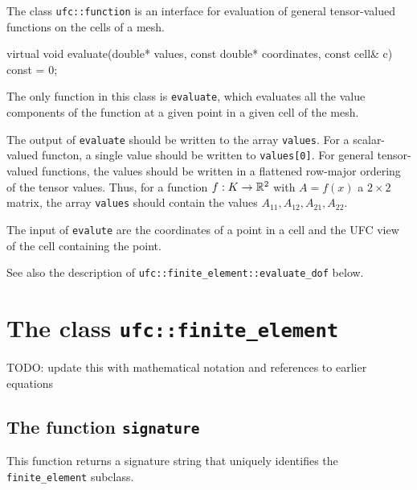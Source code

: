 The class \texttt{ufc::function} is an interface for evaluation of
general tensor-valued functions on the cells of a mesh.

\begin{code}
virtual void evaluate(double* values,
                      const double* coordinates,
                      const cell& c) const = 0;
\end{code}

The only function in this class is \texttt{evaluate},
which evaluates all the value components of the function at a given
point in a given cell of the mesh.

The output of \texttt{evaluate} should be written to the array
\texttt{values}. For a scalar-valued functon, a single value should be
written to \texttt{values[0]}. For general tensor-valued functions,
the values should be written in a flattened row-major ordering of the
tensor values. Thus, for a function $f : K \rightarrow \mathbb{R}^2$ with $A =
f(x)$ a $2 \times 2$ matrix, the array \texttt{values} should contain
the values $A_{11}, A_{12}, A_{21}, A_{22}$.

The input of \texttt{evalute} are the coordinates of a point in a cell and
the UFC view of the cell containing the point.

See also the description of
\texttt{ufc::finite\_element::evaluate\_dof}
below.

\section{The class \texttt{ufc::finite\_element}}

TODO: update this with mathematical notation and references to earlier equations






\subsection{The function \texttt{signature}}
This function returns a signature string that uniquely identifies the \texttt{finite\_element} subclass.

